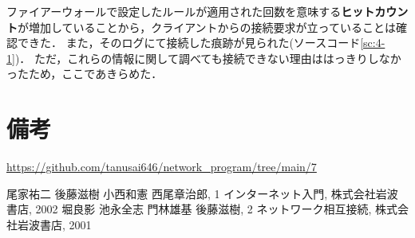 \documentclass[documentclass]{jsarticle}
\begin{document}
ファイアーウォールで設定したルールが適用された回数を意味する\textbf{ヒットカウント}が増加していることから，クライアントからの接続要求が立っていることは確認できた．
また，そのログにて接続した痕跡が見られた(ソースコード\ref*{sc:4-1})．
ただ，これらの情報に関して調べても接続できない理由ははっきりしなかったため，ここであきらめた．



\newpage
\section*{備考}
\url{https://github.com/tanusai646/network_program/tree/main/7}

\begin{thebibliography}{9}
   尾家祐二 後藤滋樹 小西和憲 西尾章治郎, 1 インターネット入門, 株式会社岩波書店, 2002 
   堀良影 池永全志 門林雄基 後藤滋樹, 2 ネットワーク相互接続, 株式会社岩波書店, 2001
\end{thebibliography}
\end{document}
